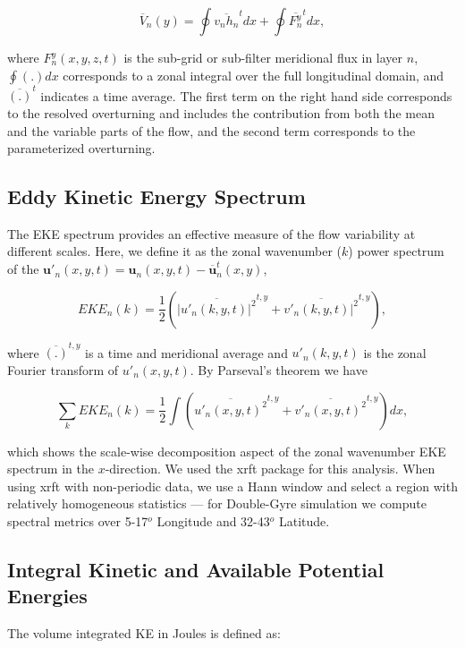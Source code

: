 \documentclass[draft,ms]{agutexSI2019}
\begin{document}
\begin{article}
\begin{equation}
    \overline{V}_n (y) = \oint \overline{v_nh_n}^t dx + \oint \overline{F^y_n}^t dx,
\end{equation}
 
where $F^y_n(x,y,z,t)$ is the sub-grid or sub-filter meridional flux in layer $n$, $\oint (.) dx$ corresponds to a zonal integral over the full longitudinal domain, and $\overline{(.)}^t$ indicates a time average. The first term on the right hand side corresponds to the resolved overturning and includes the contribution from both the mean and the variable parts of the flow, and the second term corresponds to the parameterized overturning. 

\subsection{Eddy Kinetic Energy Spectrum}
The EKE spectrum provides an effective measure of the flow variability at different scales. 
Here, we define it as the zonal wavenumber ($k$) power spectrum of the $\mathbf{u}'_n(x,y,t) = \mathbf{u}_n(x,y,t) - \overline{\mathbf{u}}^t_n(x,y)$, 
 
\begin{equation}
    EKE_n(k) = \frac{1}{2}(\overline{|u'_n(k, y,t)|^2}^{t,y} + \overline{v'_n(k, y,t)|^2}^{t,y}),
\end{equation}
 
where $\overline{(.)}^{t,y}$ is a time and meridional average and $u'_n(k, y,t)$ is the zonal Fourier transform of $u'_n(x, y,t)$. By Parseval's theorem we have
 
\begin{equation}
    \sum_k EKE_n(k) = \frac{1}{2} \int ( \overline{u'_n(x, y,t)^2}^{t,y} + \overline{v'_n(x, y,t)^2}^{t,y}) dx,
\end{equation} 
 
which shows the scale-wise decomposition aspect of the zonal wavenumber EKE spectrum in the $x$-direction. We used the xrft package \cite{xrft} for this analysis. 
When using xrft with non-periodic data, we use a Hann window and select a region with relatively homogeneous statistics --- for Double-Gyre simulation we compute spectral metrics over 5-17$^o$ Longitude and 32-43$^o$ Latitude.


\subsection{Integral Kinetic and Available Potential Energies}
The volume integrated KE in Joules is defined as:
 

\end{article}
\end{document}
